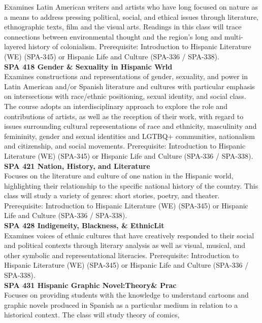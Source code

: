 \documentclass[
  letterpaper,
]{scrbook}
\begin{document}
Examines Latin American writers and artists who have long focused on
nature as a means to address pressing political, social, and ethical
issues through literature, ethnographic texts, film and the visual arts.
Readings in this class will trace connections between environmental
thought and the region's long and multi-layered history of colonialism.
Prerequisite: Introduction to Hispanic Literature (WE) (SPA-345) or
Hispanic Life and Culture (SPA-336 / SPA-338).\\
\textbf{SPA 418 Gender \& Sexuality in Hispanic Wrld}\\
Examines constructions and representations of gender, sexuality, and
power in Latin American and/or Spanish literature and cultures with
particular emphasis on intersections with race/ethnic positioning,
sexual identity, and social class. The course adopts an
interdisciplinary approach to explore the role and contributions of
artists, as well as the reception of their work, with regard to issues
surrounding cultural representations of race and ethnicity, masculinity
and femininity, gender and sexual identities and LGTBQ+ communities,
nationalism and citizenship, and social movements. Prerequisite:
Introduction to Hispanic Literature (WE) (SPA-345) or Hispanic Life and
Culture (SPA-336 / SPA-338).\\
\textbf{SPA 421 Nation, History, and Literature}\\
Focuses on the literature and culture of one nation in the Hispanic
world, highlighting their relationship to the specific national history
of the country. This class will study a variety of genres: short
stories, poetry, and theater. Prerequisite: Introduction to Hispanic
Literature (WE) (SPA-345) or Hispanic Life and Culture (SPA-336 /
SPA-338).\\
\textbf{SPA 428 Indigeneity, Blackness, \& EthnicLit}\\
Examines voices of ethnic cultures that have creatively responded to
their social and political contexts through literary analysis as well as
visual, musical, and other symbolic and representational literacies.
Prerequisite: Introduction to Hispanic Literature (WE) (SPA-345) or
Hispanic Life and Culture (SPA-336 / SPA-338).\\
\textbf{SPA 431 Hispanic Graphic Novel:Theory\& Prac}\\
Focuses on providing students with the knowledge to understand cartoons
and graphic novels produced in Spanish as a particular medium in
relation to a historical context. The class will study theory of comics,
\end{document}

